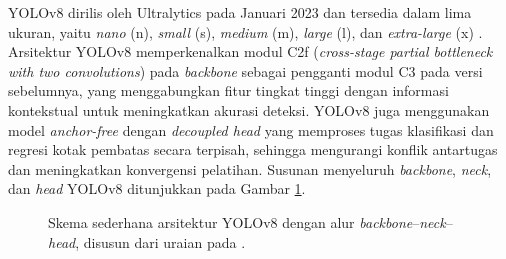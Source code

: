 YOLOv8 dirilis oleh Ultralytics pada Januari 2023 dan tersedia dalam lima ukuran, yaitu 
\textit{nano} (n), \textit{small} (s), \textit{medium} (m), \textit{large} (l), dan 
\textit{extra-large} (x) \cite{terven2023comprehensive}. Arsitektur YOLOv8 memperkenalkan 
modul C2f (\textit{cross-stage partial bottleneck with two convolutions}) pada 
\textit{backbone} sebagai pengganti modul C3 pada versi sebelumnya, yang menggabungkan 
fitur tingkat tinggi dengan informasi kontekstual untuk meningkatkan akurasi deteksi. 
YOLOv8 juga menggunakan model \textit{anchor-free} dengan \textit{decoupled head} yang 
memproses tugas klasifikasi dan regresi kotak pembatas secara terpisah, sehingga mengurangi 
konflik antartugas dan meningkatkan konvergensi pelatihan. Susunan menyeluruh 
\textit{backbone}, \textit{neck}, dan \textit{head} YOLOv8 ditunjukkan pada Gambar 
\ref{fig:arsitektur_yolov8}.

\begin{figure}[htbp]
    \centering
    \caption{Skema sederhana arsitektur YOLOv8 dengan alur \textit{backbone}--\textit{neck}--\textit{head}, disusun dari uraian pada \cite{terven2023comprehensive}.}
    \label{fig:arsitektur_yolov8}
\end{figure}

